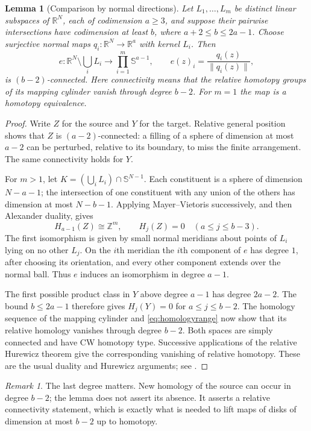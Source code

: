 \documentclass[a4paper,11pt,reqno]{amsart}
\newcommand{\R}{\mathbb R}
\newcommand{\Z}{\mathbb Z}
\newcommand{\sphere}{\mathbb S}
\newtheorem{lemma}[theorem]{Lemma}
\theoremstyle{definition}
\theoremstyle{remark}
\newtheorem{remark}[theorem]{Remark}
\numberwithin{equation}{section}
\begin{document}
\begin{lemma}[Comparison by normal directions]\label{lem:comparison}
Let $L_1,\ldots,L_m$ be distinct linear subspaces of $\R^N$, each of
codimension $a\ge3$, and suppose their pairwise intersections have
codimension at least $b$, where $a+2\le b\le2a-1$. Choose surjective
normal maps $q_i:\R^N\to\R^a$ with kernel $L_i$. Then
\[
 e:\R^N\setminus\bigcup_iL_i\longrightarrow
           \prod_{i=1}^m\sphere^{a-1},
 \qquad e(z)_i=\frac{q_i(z)}{\|q_i(z)\|},
\]
is $(b-2)$-connected. Here connectivity means that the relative
homotopy groups of its mapping cylinder vanish through degree $b-2$.
For $m=1$ the map is a homotopy equivalence.
\end{lemma}
\begin{proof}
Write $Z$ for the source and $Y$ for the target. Relative general
position shows that $Z$ is $(a-2)$-connected: a filling of a sphere of
dimension at most $a-2$ can be perturbed, relative to its boundary,
to miss the finite arrangement. The same connectivity holds for $Y$.

For $m>1$, let $K=(\bigcup_iL_i)\cap\sphere^{N-1}$. Each constituent
is a sphere of dimension $N-a-1$; the intersection of one constituent
with any union of the others has dimension at most $N-b-1$. Applying
Mayer--Vietoris successively, and then Alexander duality, gives
\begin{equation}\label{eq:homologyrange}
 H_{a-1}(Z)\cong\Z^m,
 \qquad H_j(Z)=0\quad(a\le j\le b-3).
\end{equation}
The first isomorphism is given by small normal meridians about points
of $L_i$ lying on no other $L_j$. On the $i$th meridian the $i$th
component of $e$ has degree $1$, after choosing its orientation, and
every other component extends over the normal ball. Thus $e$ induces
an isomorphism in degree $a-1$.

The first possible product class in $Y$ above degree $a-1$ has degree
$2a-2$. The bound $b\le2a-1$ therefore gives $H_j(Y)=0$ for
$a\le j\le b-2$. The homology sequence of the mapping cylinder and
\eqref{eq:homologyrange} now show that its relative homology vanishes
through degree $b-2$. Both spaces are simply connected and have CW homotopy type. Successive
applications of the relative Hurewicz theorem give the corresponding
vanishing of relative homotopy. These are the usual duality and
Hurewicz arguments; see \cite{Hatcher}.
\end{proof}

\begin{remark}\label{rem:range}
The last degree matters. New homology of the source can occur in
degree $b-2$; the lemma does not assert its absence. It asserts a
relative connectivity statement, which is exactly what is needed to
lift maps of disks of dimension at most $b-2$ up to homotopy.
\end{remark}
\end{document}

